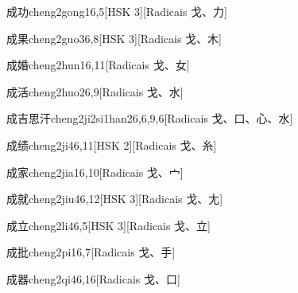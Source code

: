 \begin{entry}{成功}{cheng2gong1}{6,5}[HSK 3][Radicais ⼽、⼒]
\end{entry}

\begin{entry}{成果}{cheng2guo3}{6,8}[HSK 3][Radicais ⼽、⽊]
\end{entry}

\begin{entry}{成婚}{cheng2hun1}{6,11}[Radicais ⼽、⼥]
\end{entry}

\begin{entry}{成活}{cheng2huo2}{6,9}[Radicais ⼽、⽔]
\end{entry}

\begin{entry}{成吉思汗}{cheng2ji2si1han2}{6,6,9,6}[Radicais ⼽、⼝、⼼、⽔]
\end{entry}

\begin{entry}{成绩}{cheng2ji4}{6,11}[HSK 2][Radicais ⼽、⽷]
\end{entry}

\begin{entry}{成家}{cheng2jia1}{6,10}[Radicais ⼽、⼧]
\end{entry}

\begin{entry}{成就}{cheng2jiu4}{6,12}[HSK 3][Radicais ⼽、⼪]
\end{entry}

\begin{entry}{成立}{cheng2li4}{6,5}[HSK 3][Radicais ⼽、⽴]
\end{entry}

\begin{entry}{成批}{cheng2pi1}{6,7}[Radicais ⼽、⼿]
\end{entry}

\begin{entry}{成器}{cheng2qi4}{6,16}[Radicais ⼽、⼝]
\end{entry}

